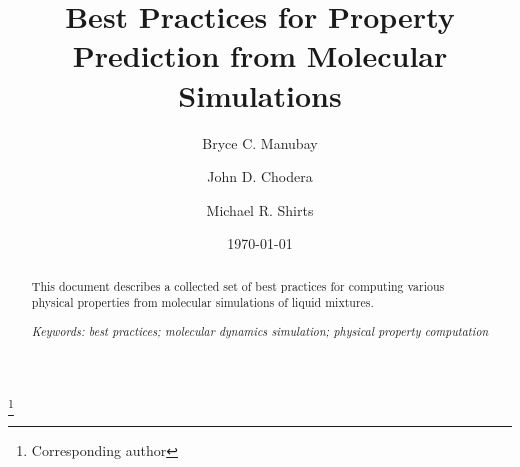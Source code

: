 \documentclass[aps,pre,twocolumn,nofootinbib,superscriptaddress,linenumbers,10pt, draft,tightenlines]{revtex4-1}
\begin{document}


\title{Best Practices for Property Prediction from Molecular Simulations}

\author{Bryce C. Manubay} 

\author{John D. Chodera}

\author{Michael R. Shirts}
\thanks{Corresponding author}

\date{\today}


\begin{abstract}
This document describes a collected set of best practices for computing various physical properties from molecular simulations of liquid mixtures.

\emph{Keywords: best practices; molecular dynamics simulation; physical property computation}


\end{abstract}
\maketitle

\listoftodos

\end{document}

